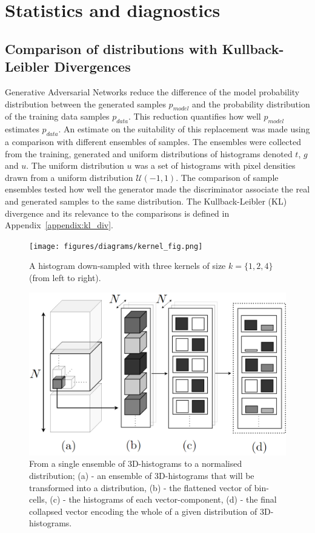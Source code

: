 \documentclass[twocolumn]{article}
\numberwithin{equation}{section}
\begin{document}
\section{Statistics and diagnostics}\label{sec:stats_and_diags}
\subsection{Comparison of distributions with Kullback-Leibler Divergences}
Generative Adversarial Networks reduce the difference of the model probability distribution between the generated samples $p_{model}$ and the probability distribution of the training data samples $p_{data}$. This reduction quantifies how well $p_{model}$ estimates $p_{data}$. An estimate on the suitability of this replacement was made using a comparison with different ensembles of samples. The ensembles were collected from the training, generated and uniform distributions of histograms denoted $t$, $g$ and $u$. The uniform distribution $u$ was a set of histograms with pixel densities drawn from a uniform distribution $\mathcal{U}(-1,1)$. The comparison of sample ensembles tested how well the generator made the discriminator associate the real and generated samples to the same distribution. The Kullback-Leibler (KL) divergence and its relevance to the comparisons is defined in Appendix~\ref{appendix:kl_div}.

\begin{figure}[!ht]%
\texttt{[image: figures/diagrams/kernel\_fig.png]}
\centering
\caption{A histogram down-sampled with three kernels of size $k=\{1, 2, 4\}$ (from left to right).}
\label{fig:kernel_fig}
\end{figure}

\begin{figure}
\includegraphics[width=\columnwidth]{figures/diagrams/kl_stat_process3.png}
\centering
\caption{From a single ensemble of 3D-histograms to a normalised distribution; (a) - an ensemble of 3D-histograms that will be transformed into a distribution, (b) - the flattened vector of bin-cells, (c) - the histograms of each vector-component, (d) - the final collapsed vector encoding the whole of a given distribution of 3D-histograms.}
\label{fig:klstat}
\end{figure}
\end{document}
